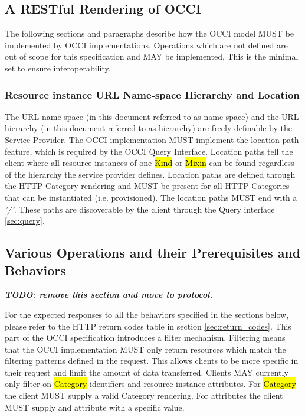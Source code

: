 \documentclass[10pt,a4paper]{article}
\begin{document}
\subsection{A RESTful Rendering of OCCI}
The following sections and paragraphs describe how the OCCI model MUST
be implemented by OCCI implementations. Operations which are not
defined are out of scope for this specification and MAY be implemented. 
This is the minimal set to ensure interoperability.

\subsubsection{Resource instance URL Name-space Hierarchy and Location}

The URL name-space (in this document referred to as name-space) and
the URL hierarchy (in this document referred to as hierarchy) are freely
definable by the Service Provider. The OCCI implementation MUST
implement the location path feature, which is required by the OCCI
Query Interface. Location paths tell the client where all resource
instances of one \hl{Kind} or \hl{Mixin} can be found regardless of
the hierarchy the service provider defines. Location paths are defined
through the HTTP Category rendering and MUST be present for all HTTP
Categories that can be instantiated (i.e. provisioned). The location
paths MUST end with a \emph{'/'}. These paths are discoverable by the
client through the Query interface \ref{sec:query}.

\subsection{Various Operations and their Prerequisites and Behaviors}
\label{sec:behaviours}

\textbf{\emph{TODO: remove this section and move to protocol.}}

For the expected responses to all the behaviors specified in the
sections below, please refer to the HTTP return codes table in section
\ref{sec:return_codes}. This part of the OCCI specification introduces
a filter mechanism. Filtering means that the OCCI implementation MUST
only return resources which match the filtering patterns defined in
the request. This allows clients to be more specific in their request
and limit the amount of data transferred. Clients MAY currently only
filter on \hl{Category} identifiers and resource instance attributes. For
\hl{Category} the client MUST supply a valid Category rendering. For
attributes the client MUST supply and attribute with a specific value.
\end{document}
